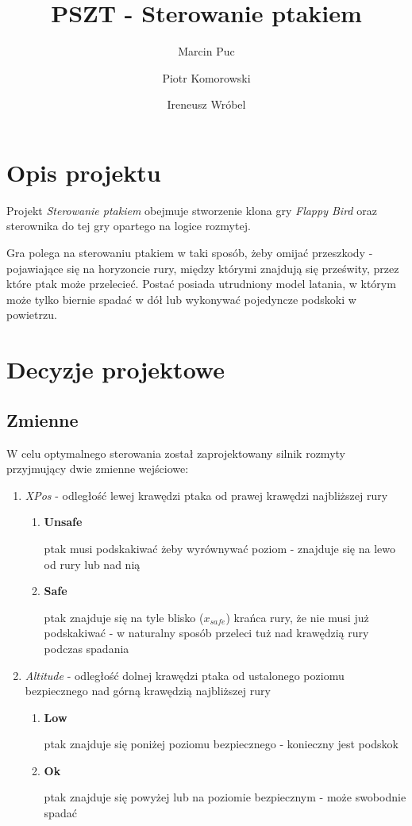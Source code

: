 \documentclass{article}
\title{PSZT - Sterowanie ptakiem}
\author{
  Marcin Puc\\
  \and
  Piotr Komorowski\\
  \and
  Ireneusz Wróbel
}
\date{}
\begin{document}
\maketitle

\section {Opis projektu}

Projekt \emph{Sterowanie ptakiem} obejmuje stworzenie klona gry \emph{Flappy
  Bird} oraz sterownika do tej gry opartego na logice rozmytej.

Gra polega na sterowaniu ptakiem w taki sposób, żeby omijać przeszkody -
pojawiające się na horyzoncie rury, między którymi znajdują się prześwity, przez
które ptak może przelecieć. Postać posiada utrudniony model latania, w którym
może tylko biernie spadać w dół lub wykonywać pojedyncze podskoki w powietrzu.

\section {Decyzje projektowe}

\subsection{Zmienne}

W celu optymalnego sterowania został zaprojektowany silnik rozmyty przyjmujący
dwie zmienne wejściowe:

\begin{enumerate}
\item \emph{XPos} - odległość lewej krawędzi ptaka od prawej krawędzi najbliższej rury
  \begin{enumerate}
  \item \textbf{Unsafe}

    ptak musi podskakiwać żeby wyrównywać poziom - znajduje się
    na lewo od rury lub nad nią

  \item \textbf{Safe}

    ptak znajduje się na tyle blisko ($x_{safe}$) krańca rury, że nie musi już podskakiwać -
    w naturalny sposób przeleci tuż nad krawędzią rury podczas spadania 

  \end{enumerate}
\item \emph{Altitude} - odległość dolnej krawędzi ptaka od ustalonego poziomu
  bezpiecznego nad górną krawędzią najbliższej rury
  \begin{enumerate}
  \item \textbf{Low}

    ptak znajduje się poniżej poziomu bezpiecznego - konieczny jest podskok

  \item \textbf{Ok}

    ptak znajduje się powyżej lub na poziomie bezpiecznym - może swobodnie spadać

  \end{enumerate}
\end{enumerate}
\end{document}
